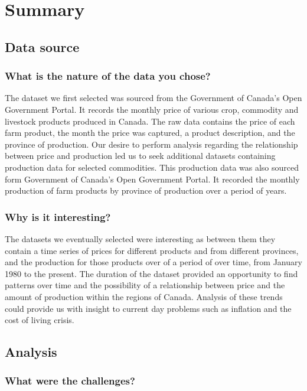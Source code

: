 \section{Summary}

\subsection{Data source}

\subsubsection{What is the nature of the data you chose?}

The dataset we first selected was sourced from the Government of Canada's Open Government Portal.
It records the monthly price of various crop, commodity and livestock products produced in Canada.
The raw data contains the price of each farm product, the month the price was captured, a product description, and the province of production.
Our desire to perform analysis regarding the relationship between price and production led us to seek additional datasets containing production data for selected commodities.
This production data was also sourced form Government of Canada's Open Government Portal.
It recorded the monthly production of farm products by province of production over a period of years.

\subsubsection{Why is it interesting?}

The datasets we eventually selected were interesting as between them they contain a time series of prices for different products and from different provinces, and the production for those products over of a period of over time, from January 1980 to the present.
The duration of the dataset provided an opportunity to find patterns over time and the possibility of a relationship between price and the amount of production within the regions of Canada.
Analysis of these trends could provide us with insight to current day problems such as inflation and the cost of living crisis.

\subsection{Analysis}

\subsubsection{What were the challenges?}

